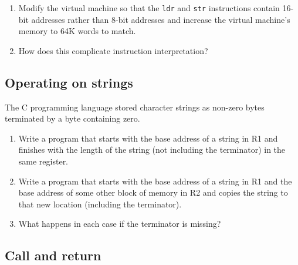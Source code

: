 \documentclass{scrbook}
\begin{document}
\begin{enumerate}

\item 

Modify the virtual machine so that the \texttt{ldr} and \texttt{str} instructions
    contain 16-bit addresses rather than 8-bit addresses
    and increase the virtual machine's memory to 64K words to match.



\item 

How does this complicate instruction interpretation?



\end{enumerate}

\subsection*{Operating on strings}


The C programming language stored character strings as non-zero bytes terminated by a byte containing zero.

\begin{enumerate}

\item 

Write a program that starts with the base address of a string in R1
    and finishes with the length of the string (not including the terminator) in the same register.



\item 

Write a program that starts with the base address of a string in R1
    and the base address of some other block of memory in R2
    and copies the string to that new location (including the terminator).



\item 

What happens in each case if the terminator is missing?



\end{enumerate}

\subsection*{Call and return}
\end{document}
